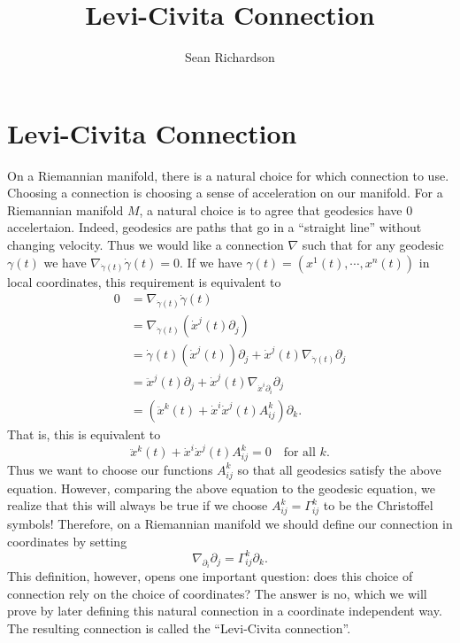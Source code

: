 \documentclass[
]{article}
\title{Levi-Civita Connection}
\author{Sean Richardson}
\date{}
\begin{document}
\maketitle

\hypertarget{levi-civita-connection}{%
\section{Levi-Civita Connection}\label{levi-civita-connection}}

On a Riemannian manifold, there is a natural choice for which connection
to use. Choosing a connection is choosing a sense of acceleration on our
manifold. For a Riemannian manifold \(M\), a natural choice is to agree
that geodesics have \(0\) accelertaion. Indeed, geodesics are paths that
go in a ``straight line'' without changing velocity. Thus we would like
a connection \(\nabla\) such that for any geodesic \(\gamma(t)\) we have
\(\nabla_{\dot{\gamma}(t)}\dot{\gamma}(t) = 0\). If we have
\(\gamma(t) = (x^1(t), \cdots, x^n(t))\) in local coordinates, this
requirement is equivalent to \begin{align}
    0 
    &= \nabla_{\dot{\gamma}(t)} \dot{\gamma}(t)\\\
    &= \nabla_{\dot{\gamma}(t)} (\dot{x}^j(t)\partial_j)\\\
    &= \dot{\gamma}(t)(\dot{x}^j(t))\partial_j + \dot{x}^j(t)\nabla_{\dot{\gamma}(t)} \partial_j\\\
    &= \ddot{x}^j(t)\partial_j + \dot{x}^j(t)\nabla_{\dot{x}^i\partial_i} \partial_j\\\
    &=  (\ddot{x}^k(t) + \dot{x}^i\dot{x}^j(t)A_{ij}^k) \partial_k.
\end{align} That is, this is equivalent to \[
    \ddot{x}^k(t) + \dot{x}^i\dot{x}^j(t)A_{ij}^k = 0 \quad \text{for all } k.
\] Thus we want to choose our functions \(A_{ij}^k\) so that all
geodesics satisfy the above equation. However, comparing the above
equation to the geodesic equation, we realize that this will always be
true if we choose \(A_{ij}^k = \Gamma_{ij}^k\) to be the Christoffel
symbols! Therefore, on a Riemannian manifold we should define our
connection in coordinates by setting \[
    \nabla_{\partial_i}\partial_j = \Gamma_{ij}^k \partial_k.
    \tag{C}
    \label{eq:lc-coords}
\] This definition, however, opens one important question: does this
choice of connection rely on the choice of coordinates? The answer is
no, which we will prove by later defining this natural connection in a
coordinate independent way. The resulting connection is called the
``Levi-Civita connection''.
\end{document}
